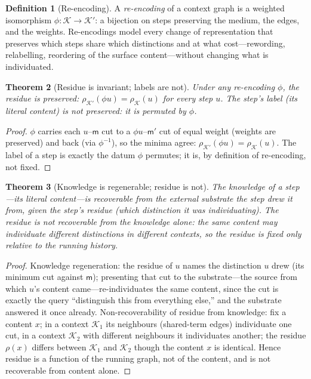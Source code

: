 \documentclass[11pt,twocolumn,a4paper]{article}
\theoremstyle{thmstyle}
\newtheorem{theorem}{Theorem}[section]
\theoremstyle{definition}
\newtheorem{definition}[theorem]{Definition}
\theoremstyle{remark}
\newcommand{\Ctx}{\mathcal{K}}          %
\newcommand{\med}{\mathsf{m}}           %
\newcommand{\res}{\rho}                 %
\begin{document}
\begin{definition}[Re-encoding]
\label{def:reencode}
A \emph{re-encoding} of a context graph is a weighted isomorphism
$\phi\colon\Ctx\to\Ctx'$: a bijection on steps preserving the medium, the edges,
and the weights. Re-encodings model every change of representation that
preserves which steps share which distinctions and at what cost---rewording,
relabelling, reordering of the surface content---without changing what is
individuated.
\end{definition}

\begin{theorem}[Residue is invariant; labels are not]
\label{thm:invariant}
Under any re-encoding $\phi$, the residue is preserved:
$\res_{\Ctx'}(\phi u)=\res_\Ctx(u)$ for every step $u$. The step's label
(its literal content) is not preserved: it is permuted by $\phi$.
\end{theorem}

\begin{proof}
$\phi$ carries each $u$--$\med$ cut to a $\phi u$--$\med'$ cut of equal weight
(weights are preserved) and back (via $\phi^{-1}$), so the minima agree:
$\res_{\Ctx'}(\phi u)=\res_\Ctx(u)$. The label of a step is exactly the datum
$\phi$ permutes; it is, by definition of re-encoding, not fixed.
\end{proof}

\begin{theorem}[Knowledge is regenerable; residue is not]
\label{thm:regenerable}
The knowledge of a step---its literal content---is recoverable from the external
substrate the step drew it from, given the step's residue (which distinction it
was individuating). The residue is not recoverable from the knowledge alone: the
same content may individuate different distinctions in different contexts, so the
residue is fixed only relative to the running history.
\end{theorem}

\begin{proof}
Knowledge regeneration: the residue of $u$ names the distinction $u$ drew (its
minimum cut against $\med$); presenting that cut to the substrate---the source
from which $u$'s content came---re-individuates the same content, since the cut
is exactly the query ``distinguish this from everything else,'' and the substrate
answered it once already. Non-recoverability of residue from knowledge: fix a
content $x$; in a context $\Ctx_1$ its neighbours (shared-term edges) individuate
one cut, in a context $\Ctx_2$ with different neighbours it individuates another;
the residue $\res(x)$ differs between $\Ctx_1$ and $\Ctx_2$ though the content
$x$ is identical. Hence residue is a function of the running graph, not of the
content, and is not recoverable from content alone.
\end{proof}
\end{document}
